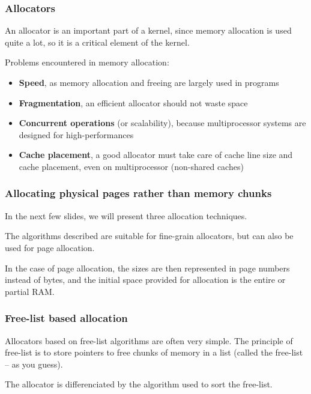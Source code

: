 \begin{frame}
  \frametitle{Allocators}

  An allocator is an important part of a kernel, since memory allocation is used quite a lot, so it is a critical element of the kernel.

  \-

  Problems encountered in memory allocation:

  \begin{itemize}
  \item
    \textbf{Speed}, as memory allocation and freeing are largely used
    in programs
  \item
    \textbf{Fragmentation}, an efficient allocator should not waste
    space
  \item
    \textbf{Concurrent operations} (or scalability), because
    multiprocessor systems are designed for high-performances
  \item
    \textbf{Cache placement}, a good allocator must take care of cache
    line size and cache placement, even on multiprocessor (non-shared
    caches)
  \end{itemize}

\end{frame}

\begin{frame}
  \frametitle{Allocating physical pages rather than memory chunks}

  In the next few slides, we will present three allocation techniques.

  \-

  The algorithms described are suitable for fine-grain allocators, but
  can also be used for page allocation.

  \-

  In the case of page allocation, the sizes are then represented in
  page numbers instead of bytes, and the initial space provided for
  allocation is the entire or partial RAM.

\end{frame}

\begin{frame}
  \frametitle{Free-list based allocation}

  Allocators based on free-list algorithms are often very simple. The
  principle of free-list is to store pointers to free chunks of memory
  in a list (called the free-list -- as you guess).

  \begin{center}
  \end{center}

  \-

  The allocator is differenciated by the algorithm used to sort the
  free-list.

\end{frame}

